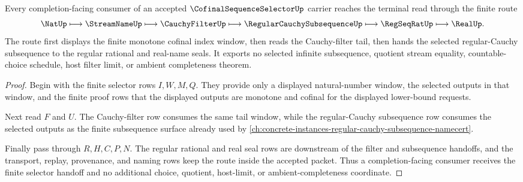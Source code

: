 \begin{theorem}
\label{thm:cofinal-sequence-selector-tail-filter-handoff}
Every completion-facing consumer of an accepted $\CofinalSequenceSelectorUp$ carrier reaches the terminal read through the finite route
$$
\NatUp
\longmapsto
\StreamNameUp
\longmapsto
\CauchyFilterUp
\longmapsto
\RegularCauchySubsequenceUp
\longmapsto
\RegSeqRatUp
\longmapsto
\RealUp .
$$
The route first displays the finite monotone cofinal index window, then reads the Cauchy-filter tail, then hands the selected regular-Cauchy subsequence to the regular rational and real-name seals. It exports no selected infinite subsequence, quotient stream equality, countable-choice schedule, host filter limit, or ambient completeness theorem.
\end{theorem}
\begin{proof}
Begin with the finite selector rows $I,W,M,Q$. They provide only a displayed natural-number window, the selected outputs in that window, and the finite proof rows that the displayed outputs are monotone and cofinal for the displayed lower-bound requests.

Next read $F$ and $U$. The Cauchy-filter row consumes the same tail window, while the regular-Cauchy subsequence row consumes the selected outputs as the finite subsequence surface already used by \autoref{ch:concrete-instances-regular-cauchy-subsequence-namecert}.

Finally pass through $R,H,C,P,N$. The regular rational and real seal rows are downstream of the filter and subsequence handoffs, and the transport, replay, provenance, and naming rows keep the route inside the accepted packet. Thus a completion-facing consumer receives the finite selector handoff and no additional choice, quotient, host-limit, or ambient-completeness coordinate.
\end{proof}



